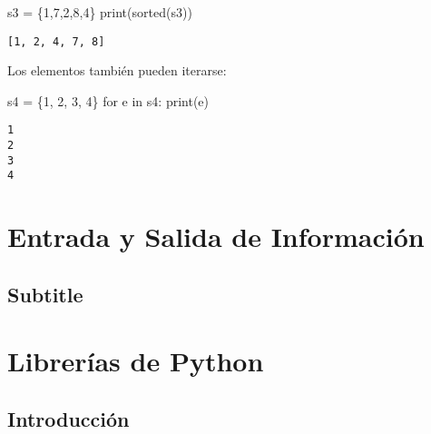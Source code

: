 \documentclass[
  letterpaper,
  DIV=11,
  numbers=noendperiod]{scrreprt}
\newenvironment{Shaded}{\begin{snugshade}}{\end{snugshade}}
\newcommand{\BuiltInTok}[1]{\textcolor[rgb]{0.00,0.23,0.31}{#1}}
\newcommand{\ControlFlowTok}[1]{\textcolor[rgb]{0.00,0.23,0.31}{#1}}
\newcommand{\DecValTok}[1]{\textcolor[rgb]{0.68,0.00,0.00}{#1}}
\newcommand{\KeywordTok}[1]{\textcolor[rgb]{0.00,0.23,0.31}{#1}}
\newcommand{\NormalTok}[1]{\textcolor[rgb]{0.00,0.23,0.31}{#1}}
\newcommand{\OperatorTok}[1]{\textcolor[rgb]{0.37,0.37,0.37}{#1}}
\begin{document}
\begin{Shaded}
\begin{Highlighting}[]
\NormalTok{s3 }\OperatorTok{=}\NormalTok{ \{}\DecValTok{1}\NormalTok{,}\DecValTok{7}\NormalTok{,}\DecValTok{2}\NormalTok{,}\DecValTok{8}\NormalTok{,}\DecValTok{4}\NormalTok{\}}
\BuiltInTok{print}\NormalTok{(}\BuiltInTok{sorted}\NormalTok{(s3))}
\end{Highlighting}
\end{Shaded}

\begin{verbatim}
[1, 2, 4, 7, 8]
\end{verbatim}

Los elementos también pueden iterarse:

\begin{Shaded}
\begin{Highlighting}[]
\NormalTok{s4 }\OperatorTok{=}\NormalTok{ \{}\DecValTok{1}\NormalTok{, }\DecValTok{2}\NormalTok{, }\DecValTok{3}\NormalTok{, }\DecValTok{4}\NormalTok{\}}
\ControlFlowTok{for}\NormalTok{ e }\KeywordTok{in}\NormalTok{ s4:}
  \BuiltInTok{print}\NormalTok{(e)}
\end{Highlighting}
\end{Shaded}

\begin{verbatim}
1
2
3
4
\end{verbatim}


\chapter{Entrada y Salida de
Información}\label{entrada-y-salida-de-informaciuxf3n}

\section{Subtitle}\label{subtitle}


\chapter{Librerías de Python}\label{libreruxedas-de-python}

\section{Introducción}\label{introducciuxf3n-1}
\end{document}
